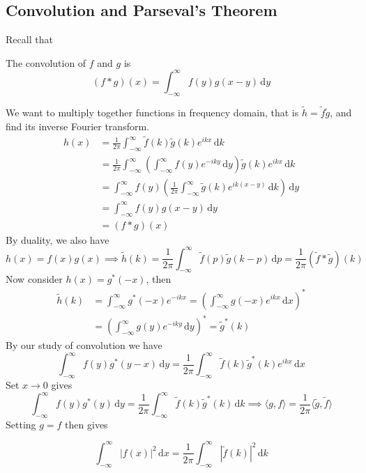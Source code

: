 \subsection{Convolution and Parseval's Theorem}
Recall that
\begin{definition}
    The convolution of $f$ and $g$ is
    $$(f\ast g)(x)=\int_{-\infty}^\infty f(y)g(x-y)\,\mathrm dy$$
\end{definition}
We want to multiply together functions in frequency domain, that is $\tilde{h}=\tilde{f}\tilde{g}$, and find its inverse Fourier transform.
\begin{align*}
    h(x)&=\frac{1}{2\pi}\int_{-\infty}^\infty\tilde{f}(k)\tilde{g}(k)e^{ikx}\,\mathrm dk\\
    &=\frac{1}{2\pi}\int_{-\infty}^\infty\left( \int_{-\infty}^\infty f(y)e^{-iky}\,\mathrm dy \right)\tilde{g}(k)e^{ikx}\,\mathrm dk\\
    &=\int_{-\infty}^\infty f(y)\left( \frac{1}{2\pi}\int_{-\infty}^\infty\tilde{g}(k)e^{ik(x-y)}\,\mathrm dk \right)\,\mathrm dy\\
    &=\int_{-\infty}^\infty f(y)g(x-y)\,\mathrm dy\\
    &=(f\ast g)(x)
\end{align*}
By duality, we also have
$$h(x)=f(x)g(x)\implies \tilde{h}(k)=\frac{1}{2\pi}\int_{-\infty}^\infty \tilde{f}(p)\tilde{g}(k-p)\,\mathrm dp=\frac{1}{2\pi}(\tilde{f}\ast\tilde{g})(k)$$
Now consider $h(x)=g^*(-x)$, then
\begin{align*}
    \tilde{h}(k)&=\int_{-\infty}^\infty g^\ast(-x)e^{-ikx}=\left( \int_{-\infty}^\infty g(-x)e^{ikx}\,\mathrm dx \right)^*\\
    &=\left( \int_{-\infty}^\infty g(y)e^{-iky}\,\mathrm dy \right)^*=\tilde{g}^*(k)
\end{align*}
By our study of convolution we have
$$\int_{-\infty}^\infty f(y)g^*(y-x)\,\mathrm dy=\frac{1}{2\pi}\int_{-\infty}^\infty\tilde{f}(k)\tilde{g}^*(k)e^{ikx}\,\mathrm dx$$
Set $x\to 0$ gives
$$\int_{-\infty}^\infty f(y)g^*(y)\,\mathrm dy=\frac{1}{2\pi}\int_{-\infty}^\infty\tilde{f}(k)\tilde{g}^*(k)\,\mathrm dk\implies\langle g,f\rangle=\frac{1}{2\pi}\langle \tilde{g},\tilde{f}\rangle$$
Setting $g=f$ then gives
\begin{theorem}
    $$\int_{-\infty}^\infty|f(x)|^2\,\mathrm dx=\frac{1}{2\pi}\int_{-\infty}^\infty |\tilde{f}(k)|^2\,\mathrm dk$$
\end{theorem}

